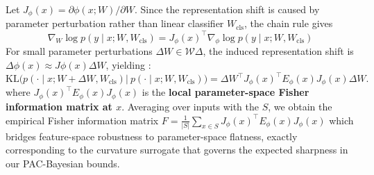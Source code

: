 \documentclass{article} %
\begin{document}
 



 





 
Let $J_\phi(x)=\partial \phi(x;W)/\partial W$. Since the representation shift is caused by parameter perturbation rather than linear classifier $W_{\mathrm{cls}}$, the chain rule gives
 $$
 \nabla_W \log p(y \mid x; W, W_{\mathrm{cls}})=J_\phi(x)^\top  \nabla_\phi \log p(y \mid x; W, W_{\mathrm{cls}})
 $$
For small parameter perturbations $\Delta W \in \mathcal{W}\Delta$, the induced representation shift is $\Delta\phi(x) \approx J\phi(x)\Delta W$, yielding :
\[
\mathrm{KL}\Big(p(\cdot\mid x; W+\Delta W, W_{\mathrm{cls}})  \big|\ p(\cdot\mid x; W, W_{\mathrm{cls}})\Big)  =  \Delta W^\top J_\phi(x)^\top E_\phi(x) J_\phi(x)\Delta W. 
\]
where $J_\phi(x)^\top E_\phi(x) J_\phi(x)$ is the \textbf{local parameter-space Fisher information matrix at $x$}.
Averaging over inputs with the $S$,  we obtain the empirical Fisher information matrix 
$
F= \frac{1}{|S|}\sum_{x\in S} J_\phi(x)^\top E_\phi(x)  J_\phi(x)
$
which bridges feature-space robustness to parameter-space flatness, exactly corresponding to the curvature surrogate that governs the expected sharpness in our PAC-Bayesian bounds.
\end{document}
